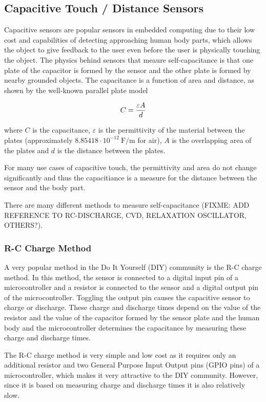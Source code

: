 \documentclass{sigchi-ext}
\begin{document}
\subsection{Capacitive Touch / Distance Sensors}
Capacitive sensors are popular sensors in embedded computing due to their low cost
and capabilities of detecting approaching human body parts, which allows the
object to give feedback to the user even before the user is physically touching
the object. The physics behind sensors that meaure self-capacitance is that one
plate of the capacitor is formed by the sensor and the other plate is formed by
nearby grounded objects. The capacitance is a function of area and distance, as
shown by the well-known parallel plate model

\begin{equation}
C = {{\varepsilon A} \over {d}}
\end{equation}

where $C$ is the capacitance, $\varepsilon$ is the permittivity of the material
between the plates (approximately $8.85418 \cdot 10^{-12} ~ \textrm{F/m}$ for
air), $A$ is the overlapping area of the plates and $d$ is the distance between
the plates.

For many use cases of capacitive touch, the permittivity and area do not change
significantly and thus the capacitiance is a measure for the distance between
the sensor and the body part.

There are many different methods to measure
self-capacitance (FIXME: ADD REFERENCE TO RC-DISCHARGE, CVD, RELAXATION
OSCILLATOR, OTHERS?). 

\subsubsection{R-C Charge Method}
A very popular method in the Do It Yourself (DIY) community is the R-C charge
method. In this method, the sensor is connected to a digital input pin of a
microcontroller and a resistor is connected to the sensor and a digital output
pin of the microcontroller. Toggling the output pin causes the capacitive sensor
to charge or discharge. These charge and discharge times depend on the value of
the resistor and the value of the capacitor formed by the sensor plate and the
human body and the microcontroller determines the capacitance by measuring these
charge and discharge times.

The R-C charge method is very simple and low cost as it requires only an
additional resistor and two General Purpose Input Output pins (GPIO pins) of a
microcontroller, which makes it very attractive to the DIY community.  However,
since it is based on measuring charge and discharge times it is also relatively
slow.
\end{document}
